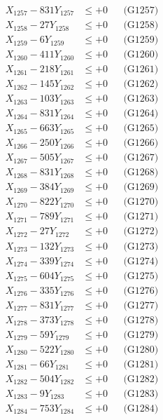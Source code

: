 \documentclass[a4paper,10pt]{article}
\begin{document}
{\begin{align}
X_{1257} - 831Y_{1257} &\leq +0 && \text{(G1257)} \\
X_{1258} - 27Y_{1258} &\leq +0 && \text{(G1258)} \\
X_{1259} - 6Y_{1259} &\leq +0 && \text{(G1259)} \\
X_{1260} - 411Y_{1260} &\leq +0 && \text{(G1260)} \\
\allowbreak
X_{1261} - 218Y_{1261} &\leq +0 && \text{(G1261)} \\
X_{1262} - 145Y_{1262} &\leq +0 && \text{(G1262)} \\
X_{1263} - 103Y_{1263} &\leq +0 && \text{(G1263)} \\
X_{1264} - 831Y_{1264} &\leq +0 && \text{(G1264)} \\
X_{1265} - 663Y_{1265} &\leq +0 && \text{(G1265)} \\
X_{1266} - 250Y_{1266} &\leq +0 && \text{(G1266)} \\
X_{1267} - 505Y_{1267} &\leq +0 && \text{(G1267)} \\
X_{1268} - 831Y_{1268} &\leq +0 && \text{(G1268)} \\
X_{1269} - 384Y_{1269} &\leq +0 && \text{(G1269)} \\
X_{1270} - 822Y_{1270} &\leq +0 && \text{(G1270)} \\
\allowbreak
X_{1271} - 789Y_{1271} &\leq +0 && \text{(G1271)} \\
X_{1272} - 27Y_{1272} &\leq +0 && \text{(G1272)} \\
X_{1273} - 132Y_{1273} &\leq +0 && \text{(G1273)} \\
X_{1274} - 339Y_{1274} &\leq +0 && \text{(G1274)} \\
X_{1275} - 604Y_{1275} &\leq +0 && \text{(G1275)} \\
X_{1276} - 335Y_{1276} &\leq +0 && \text{(G1276)} \\
X_{1277} - 831Y_{1277} &\leq +0 && \text{(G1277)} \\
X_{1278} - 373Y_{1278} &\leq +0 && \text{(G1278)} \\
X_{1279} - 59Y_{1279} &\leq +0 && \text{(G1279)} \\
X_{1280} - 522Y_{1280} &\leq +0 && \text{(G1280)} \\
\allowbreak
X_{1281} - 66Y_{1281} &\leq +0 && \text{(G1281)} \\
X_{1282} - 504Y_{1282} &\leq +0 && \text{(G1282)} \\
X_{1283} - 9Y_{1283} &\leq +0 && \text{(G1283)} \\
X_{1284} - 753Y_{1284} &\leq +0 && \text{(G1284)} \\

\end{align}}
\end{document}
